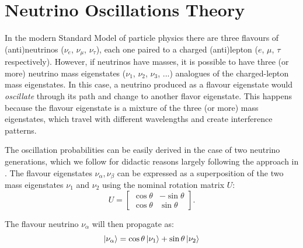 \section{Neutrino Oscillations Theory}
In the modern Standard Model of particle physics there are three flavours of (anti)neutrinos ($\nu_{e}$, $\nu_{\mu}$, $\nu_{\tau}$), each one paired to a charged (anti)lepton ($e$, $\mu$, $\tau$ respectively). 
However, if neutrinos have masses, it is possible to have three (or more) neutrino mass eigenstates ($\nu_{1}$, $\nu_{2}$, $\nu_{3}$, ...) analogues of the charged-lepton mass eigenstates. 
In this case, a neutrino produced as a flavour eigenstate would \emph{oscillate} through its path and change to another flavor eigenstate. This happens because the flavour eigenstate is a mixture of the three (or more) mass eigenstates, which travel with different wavelengths and create interference patterns. 

The oscillation probabilities can be easily derived in the case of two neutrino generations, which we follow for didactic reasons largely following the approach in \cite{deGouvea:2004gd}. The flavour eigenstates $\nu_{\alpha}, \nu_{\beta}$ can be expressed as a superposition of the two mass eigenstates $\nu_1$ and $\nu_2$ using the nominal rotation matrix $U$:
\begin{equation}
U = \begin{bmatrix}
    \cos\theta & -\sin\theta \\
    \cos\theta & \sin\theta
    \end{bmatrix}.
\end{equation}

The flavour neutrino $\nu_{\alpha}$ will then propagate as: 
\begin{equation}
    \ket{\nu_{\alpha}} = \cos\theta\ket{\nu_{1}}+\sin\theta\ket{\nu_{2}}
\end{equation}

